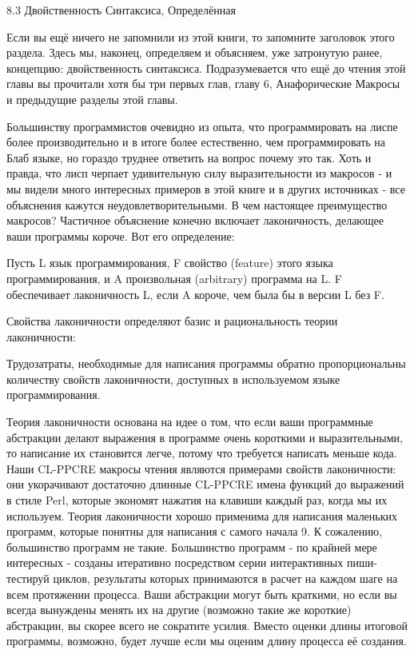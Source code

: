 8.3 Двойственность Синтаксиса, Определённая

Если вы ещё ничего не запомнили из этой книги, то запомните заголовок этого раздела. Здесь мы, наконец, определяем и объясняем, уже затронутую ранее, концепцию: двойственность синтаксиса. Подразумевается что ещё до чтения этой главы вы прочитали хотя бы три первых глав, главу 6, Анафорические Макросы и предыдущие разделы этой главы.

Большинству программистов очевидно из опыта, что программировать на лиспе более производительно и в итоге более естественно, чем программировать на Блаб языке, но гораздо труднее ответить на вопрос почему это так. Хоть и правда, что лисп черпает удивительную силу выразительности из макросов - и мы видели много интересных примеров в этой книге и в других источниках - все объяснения кажутся неудовлетворительными. В чем настоящее преимущество макросов? Частичное объяснение конечно включает лаконичность, делающее ваши программы короче. Вот его определение:

Пусть L язык программирования, F свойство (feature) этого языка программирования, и A произвольная (arbitrary) программа на L. F обеспечивает лаконичность L, если A короче, чем была бы в версии L без F. 

Свойства лаконичности определяют базис и рациональность теории лаконичности:

Трудозатраты, необходимые для написания программы обратно пропорциональны количеству свойств лаконичности, доступных в используемом языке программирования.

Теория лаконичности основана на идее о том, что если ваши программные абстракции делают выражения в программе очень короткими и выразительными, то написание их становится легче, потому что требуется написать меньше кода. Наши CL-PPCRE макросы чтения являются примерами свойств лаконичности: они укорачивают достаточно длинные CL-PPCRE имена функций до выражений в стиле Perl, которые экономят нажатия на клавиши каждый раз, когда мы их используем. Теория лаконичности хорошо применима для написания маленьких программ, которые понятны для написания с самого начала 9. К сожалению, большинство программ не такие. Большинство программ - по крайней мере интересных - созданы итеративно посредством серии интерактивных пиши-тестируй циклов, результаты которых принимаются в расчет на каждом шаге на всем протяжении процесса. Ваши абстракции могут быть краткими, но если вы всегда вынуждены менять их на другие (возможно такие же короткие) абстракции, вы скорее всего не сократите усилия. Вместо оценки длины итоговой программы, возможно, будет лучше если мы оценим длину процесса её создания.

